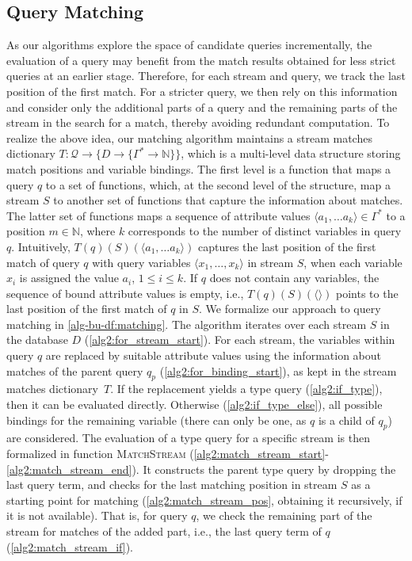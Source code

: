 \subsection{Query Matching}
\label{sec:matching}
As our algorithms explore the space of candidate queries
incrementally, the evaluation of a query may
benefit from the match results obtained for less strict queries at an
earlier stage. Therefore, for each stream and query, we track the
last position of the first match. For a stricter query, we then rely on this
information
and consider only the additional parts of a query and the remaining parts of
the stream in the search for a match, thereby avoiding redundant
computation.
To realize the above idea, our matching algorithm maintains a stream matches
dictionary $T: \mathcal{Q} \rightarrow \{D \rightarrow \{ \Gamma^*
\rightarrow  \mathbb{N}\}\}$, which is a multi-level data structure storing
match positions and variable bindings. The first level is a function
that maps a query $q$ to a set of functions, which, at the second level of
the structure, map a stream $S$ to another set of functions that capture the
information about matches. The latter set of functions maps a sequence of
attribute values $\langle a_1,\ldots a_k \rangle \in \Gamma^*$ to a position
$m\in \mathbb{N}$, where $k$ corresponds to the number of distinct variables
in query $q$. Intuitively, $T(q)(S)(\langle a_1,\ldots a_k \rangle)$
captures the last position of the first match of query $q$ with query
variables $\langle x_1,\ldots, x_k \rangle$ in stream $S$, when each
variable $x_i$ is assigned the value $a_i$, $1\leq i\leq k$.
If $q$ does not contain any variables, the sequence of bound attribute
values is empty, i.e., $T(q)(S)(\langle \rangle)$ points to the last
position of the first match of $q$ in $S$.
We formalize our approach to query matching in \autoref{alg-bu-df:matching}.
The algorithm iterates over each
stream $S$ in the database $D$
(\autoref{alg2:for_stream_start}).
For each stream, the variables within query $q$ are replaced by suitable
attribute values using the information about matches of the parent query
$q_p$ (\autoref{alg2:for_binding_start}), as kept in the stream matches
dictionary~$T$.
If the replacement yields a type query (\autoref{alg2:if_type}), then it can
be evaluated directly. Otherwise
(\autoref{alg2:if_type_else}), all possible bindings for
the remaining variable (there can only be one, as $q$ is a child of $q_p$)
are considered.
The evaluation of a type query for a specific stream is then formalized in
function \textsc{MatchStream}
(\autoref{alg2:match_stream_start}-\ref{alg2:match_stream_end}).
It constructs the parent type query
by dropping the last query term, and
checks for the last matching position in stream $S$ as a starting point for
matching (\autoref{alg2:match_stream_pos}, obtaining it recursively, if it
is not available). That is, for query $q$, we check the remaining part of
the stream for matches of the added part, i.e., the last query term of $q$
(\autoref{alg2:match_stream_if}).
